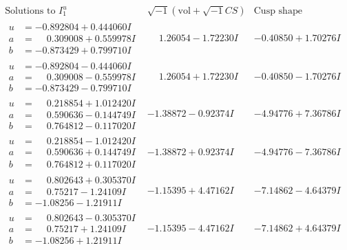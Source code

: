 \documentclass[1p]{elsarticle_modified}
\theoremstyle{definition}
\newcommand{\I}{\sqrt{-1}}
\begin{document}
$$\begin{array}{c|c|c}  
\text{Solutions to }I^u_{1}& \I (\text{vol} + \sqrt{-1}CS) & \text{Cusp shape}\\
 \hline 
\begin{aligned}
u &= -0.892804 + 0.444060 I \\
a &= \phantom{-}0.309008 + 0.559978 I \\
b &= -0.873429 + 0.799710 I\end{aligned}
 & \phantom{-}1.26054 - 1.72230 I & -0.40850 + 1.70276 I \\ \hline\begin{aligned}
u &= -0.892804 - 0.444060 I \\
a &= \phantom{-}0.309008 - 0.559978 I \\
b &= -0.873429 - 0.799710 I\end{aligned}
 & \phantom{-}1.26054 + 1.72230 I & -0.40850 - 1.70276 I \\ \hline\begin{aligned}
u &= \phantom{-}0.218854 + 1.012420 I \\
a &= \phantom{-}0.590636 - 0.144749 I \\
b &= \phantom{-}0.764812 - 0.117020 I\end{aligned}
 & -1.38872 - 0.92374 I & -4.94776 + 7.36786 I \\ \hline\begin{aligned}
u &= \phantom{-}0.218854 - 1.012420 I \\
a &= \phantom{-}0.590636 + 0.144749 I \\
b &= \phantom{-}0.764812 + 0.117020 I\end{aligned}
 & -1.38872 + 0.92374 I & -4.94776 - 7.36786 I \\ \hline\begin{aligned}
u &= \phantom{-}0.802643 + 0.305370 I \\
a &= \phantom{-}0.75217 - 1.24109 I \\
b &= -1.08256 - 1.21911 I\end{aligned}
 & -1.15395 + 4.47162 I & -7.14862 - 4.64379 I \\ \hline\begin{aligned}
u &= \phantom{-}0.802643 - 0.305370 I \\
a &= \phantom{-}0.75217 + 1.24109 I \\
b &= -1.08256 + 1.21911 I\end{aligned}
 & -1.15395 - 4.47162 I & -7.14862 + 4.64379 I \\ \hline\begin{aligned}

\end{aligned}
\end{array}$$
\end{document}
